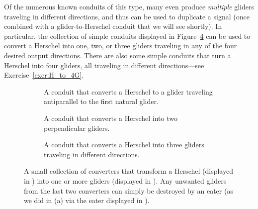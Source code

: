 Of the numerous known conduits of this type, many even produce \emph{multiple} gliders traveling in different directions, and thus can be used to duplicate a signal (once combined with a glider-to-Herschel conduit that we will see shortly). In particular, the collection of simple conduits displayed in Figure~\ref{fig:herschel_to_glider} can be used to convert a Herschel into one, two, or three gliders traveling in any of the four desired output directions. There are also some simple conduits that turn a Herschel into four gliders, all traveling in different directions---see Exercise~\ref{exer:H_to_4G}.


\begin{figure}[!htb]
	\centering
	\begin{subfigure}{.3\textwidth}
		\centering\vspace*{0.4cm}
		\caption{A conduit that converts a Herschel to a glider traveling antiparallel to the first natural glider.}
		\label{fig:H_to_G}
	\end{subfigure}\quad%
	\begin{subfigure}{.31\textwidth}
		\centering{}
		\caption{A conduit that converts a Herschel into two perpendicular gliders.}
		\label{fig:H_to_2G}
	\end{subfigure}\quad%
	\begin{subfigure}{.31\textwidth}
		\centering{}
		\caption{A conduit that converts a Herschel into three gliders traveling in different directions.}
		\label{fig:H_to_3G}
	\end{subfigure}
	\caption{A small collection of converters that transform a Herschel (displayed in ) into one or more gliders (displayed in ). Any unwanted gliders from the last two converters can simply be destroyed by an eater (as we did in (a) via the eater displayed in ).}\label{fig:herschel_to_glider}
\end{figure}

